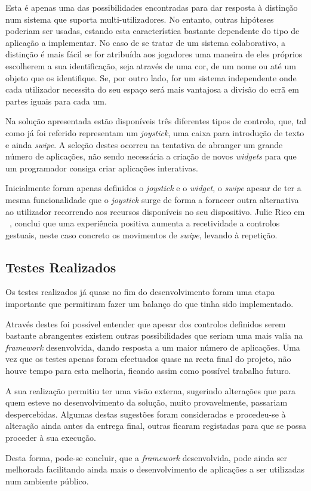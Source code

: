 Esta é apenas uma das possibilidades encontradas para dar resposta à distinção num sistema que suporta multi-utilizadores. No entanto, outras hipóteses poderiam ser usadas, estando esta característica bastante dependente do tipo de aplicação a implementar. No caso de se tratar de um sistema colaborativo, a distinção é mais fácil se for atribuída aos jogadores uma maneira de eles próprios escolherem a sua identificação, seja através de uma cor, de um nome ou até um objeto que os identifique. Se, por outro lado, for um sistema independente onde cada utilizador necessita do seu espaço será mais vantajosa a divisão do ecrã em partes iguais para cada um.

Na solução apresentada estão disponíveis três diferentes tipos de controlo, que, tal como já foi referido representam um \textit{joystick}, uma caixa para introdução de texto e ainda \textit{swipe}. A seleção destes ocorreu na tentativa de abranger um grande número de aplicações, não sendo necessária a criação de novos \textit{widgets} para que um programador consiga criar aplicações interativas. 

Inicialmente foram apenas definidos o \textit{joystick} e o \textit{widget}, o \textit{swipe} apesar de ter a mesma funcionalidade que o \textit{joystick} surge de forma a fornecer outra alternativa ao utilizador recorrendo aos recursos disponíveis no seu dispositivo. 
Julie Rico em ~\cite{Rico2010}, conclui que uma experiência positiva aumenta a recetividade a controlos gestuais, neste caso concreto os movimentos de \textit{swipe}, levando à repetição.  


\subsection*{Testes Realizados}

Os testes realizados já quase no fim do desenvolvimento foram uma etapa importante que permitiram fazer um balanço do que tinha sido implementado.

Através destes foi possível entender que apesar dos controlos definidos serem bastante abrangentes existem outras possibilidades que seriam uma mais valia na \textit{framework} desenvolvida, dando resposta a um maior número de aplicações. Uma vez que os testes apenas foram efectuados quase na recta final do projeto, não houve tempo para esta melhoria, ficando assim como possível trabalho futuro.

A sua realização permitiu ter uma visão externa, sugerindo alterações que para quem esteve no desenvolvimento da solução, muito provavelmente, passariam despercebidas. Algumas destas sugestões foram consideradas e procedeu-se à alteração ainda antes da entrega final, outras ficaram registadas para que se possa proceder à sua execução.

Desta forma, pode-se concluir, que a \textit{framework} desenvolvida, pode ainda ser melhorada facilitando ainda mais o desenvolvimento de aplicações a ser utilizadas num ambiente público.









